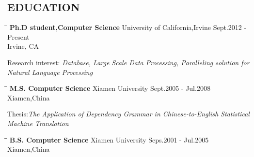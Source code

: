 \documentclass{res}
\begin{document}
\begin{resume}
\section{EDUCATION}          
   \vspace{-0.1in}	
   \begin{tabbing}
   \hspace{2.3in}\= \hspace{2.6in}\= \kill %
    {\bf Ph.D student,Computer Science} \>  University of California,Irvine \>Sept.2012 - Present\\
                             \>Irvine, CA
   \end{tabbing}\vspace{-20pt}      %
   Research interest:\emph{ Database, Large Scale Data Processing, Paralleling solution for Natural Language Processing}
   \begin{tabbing}
   \hspace{2.3in}\= \hspace{2.6in}\= \kill %
    {\bf M.S. Computer Science} \>Xiamen University     \>Sept.2005 - Jul.2008\\
                             \>Xiamen,China
   \end{tabbing}\vspace{-20pt}      %
    Thesis:\emph{The Application of Dependency Grammar in Chinese-to-English Statistical Machine Translation}
   \begin{tabbing}
   \hspace{2.3in}\= \hspace{2.6in}\= \kill %
    {\bf B.S. Computer Science} \>Xiamen University     \>Seps.2001 - Jul.2005\\
                             \>Xiamen,China
   \end{tabbing}\vspace{-20pt}      %
 

\end{resume}
\end{document}
